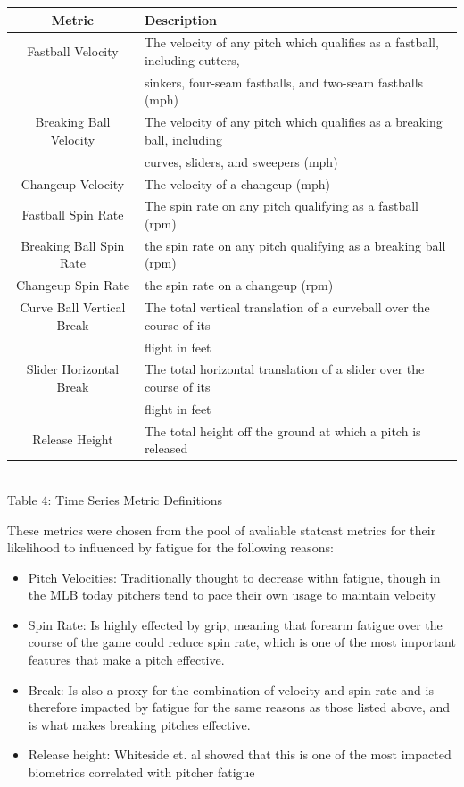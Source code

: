 \documentclass[12 pt]{article}
\begin{document}
\begin{center}
    \begin{tabular}{||c | l||} 
     \hline
     Metric & Description  \\ [0.5ex] 
     \hline
     Fastball Velocity & The velocity of any pitch which qualifies as a fastball, including cutters, \\
     & sinkers, four-seam fastballs, and two-seam fastballs (mph) \\
     \hline
     Breaking Ball Velocity & The velocity of any pitch which qualifies as a breaking ball, including \\ 
     & curves, sliders, and sweepers (mph)\\
     \hline 
     Changeup Velocity & The velocity of a changeup (mph)\\
     \hline 
     Fastball Spin Rate & The spin rate on any pitch qualifying as a fastball (rpm)\\
     \hline 
     Breaking Ball Spin Rate & the spin rate on any pitch qualifying as a breaking ball (rpm)\\ 
     \hline 
     Changeup Spin Rate & the spin rate on a changeup (rpm) \\
     \hline
     Curve Ball Vertical Break & The total vertical translation of a curveball over the course of its \\
     & flight in feet \\
     \hline 
     Slider Horizontal Break & The total horizontal translation of a slider over the course of its \\
     & flight in feet \\
     \hline
     Release Height & The total height off the ground at which a pitch is released \\
     \hline
    \end{tabular}
    \newline \\ Table 4: Time Series Metric Definitions
\end{center}
\indent These metrics were chosen from the pool of avaliable statcast metrics for their 
likelihood to influenced by fatigue for the following reasons: 
\begin{itemize}
    \item Pitch Velocities: Traditionally thought to decrease withn fatigue, though 
    in the MLB today pitchers tend to pace their own usage to maintain velocity
    \item Spin Rate: Is highly effected by grip, meaning that forearm fatigue over the 
    course of the game could reduce spin rate, which is one of the most important
    features that make a pitch effective.
    \item Break: Is also a proxy for the combination of velocity and spin rate and is therefore impacted by fatigue for the same reasons as those listed above, and is 
    what makes breaking pitches effective. 
    \item Release height: Whiteside et. al showed that this is one of the most impacted 
    biometrics correlated with pitcher fatigue
\end{itemize}
\end{document}
